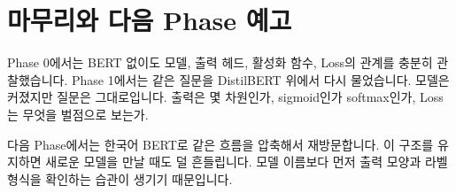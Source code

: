 \chapter*{마무리와 다음 Phase 예고}

Phase 0에서는 BERT 없이도 모델, 출력 헤드, 활성화 함수, Loss의 관계를 충분히 관찰했습니다. Phase 1에서는 같은 질문을 DistilBERT 위에서 다시 물었습니다. 모델은 커졌지만 질문은 그대로입니다. 출력은 몇 차원인가, sigmoid인가 softmax인가, Loss는 무엇을 벌점으로 보는가.

다음 Phase에서는 한국어 BERT로 같은 흐름을 압축해서 재방문합니다. 이 구조를 유지하면 새로운 모델을 만날 때도 덜 흔들립니다. 모델 이름보다 먼저 출력 모양과 라벨 형식을 확인하는 습관이 생기기 때문입니다.
